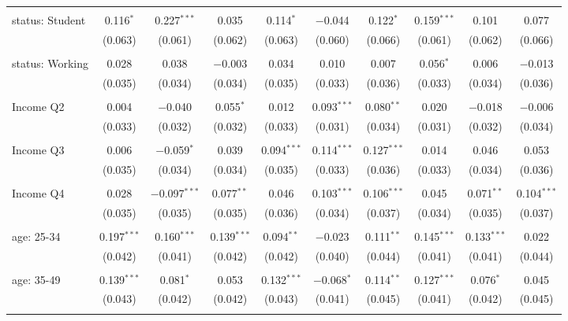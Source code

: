 \begin{tabular}{@{\extracolsep{5pt}}lccccccccc}
  & & & & & & & & & \\ 
 status: Student & 0.116$^{*}$ & 0.227$^{***}$ & 0.035 & 0.114$^{*}$ & $-$0.044 & 0.122$^{*}$ & 0.159$^{***}$ & 0.101 & 0.077 \\ 
  & (0.063) & (0.061) & (0.062) & (0.063) & (0.060) & (0.066) & (0.061) & (0.062) & (0.066) \\ 
  & & & & & & & & & \\ 
 status: Working & 0.028 & 0.038 & $-$0.003 & 0.034 & 0.010 & 0.007 & 0.056$^{*}$ & 0.006 & $-$0.013 \\ 
  & (0.035) & (0.034) & (0.034) & (0.035) & (0.033) & (0.036) & (0.033) & (0.034) & (0.036) \\ 
  & & & & & & & & & \\ 
 Income Q2 & 0.004 & $-$0.040 & 0.055$^{*}$ & 0.012 & 0.093$^{***}$ & 0.080$^{**}$ & 0.020 & $-$0.018 & $-$0.006 \\ 
  & (0.033) & (0.032) & (0.032) & (0.033) & (0.031) & (0.034) & (0.031) & (0.032) & (0.034) \\ 
  & & & & & & & & & \\ 
 Income Q3 & 0.006 & $-$0.059$^{*}$ & 0.039 & 0.094$^{***}$ & 0.114$^{***}$ & 0.127$^{***}$ & 0.014 & 0.046 & 0.053 \\ 
  & (0.035) & (0.034) & (0.034) & (0.035) & (0.033) & (0.036) & (0.033) & (0.034) & (0.036) \\ 
  & & & & & & & & & \\ 
 Income Q4 & 0.028 & $-$0.097$^{***}$ & 0.077$^{**}$ & 0.046 & 0.103$^{***}$ & 0.106$^{***}$ & 0.045 & 0.071$^{**}$ & 0.104$^{***}$ \\ 
  & (0.035) & (0.035) & (0.035) & (0.036) & (0.034) & (0.037) & (0.034) & (0.035) & (0.037) \\ 
  & & & & & & & & & \\ 
 age: 25-34 & 0.197$^{***}$ & 0.160$^{***}$ & 0.139$^{***}$ & 0.094$^{**}$ & $-$0.023 & 0.111$^{**}$ & 0.145$^{***}$ & 0.133$^{***}$ & 0.022 \\ 
  & (0.042) & (0.041) & (0.042) & (0.042) & (0.040) & (0.044) & (0.041) & (0.041) & (0.044) \\ 
  & & & & & & & & & \\ 
 age: 35-49 & 0.139$^{***}$ & 0.081$^{*}$ & 0.053 & 0.132$^{***}$ & $-$0.068$^{*}$ & 0.114$^{**}$ & 0.127$^{***}$ & 0.076$^{*}$ & 0.045 \\ 
  & (0.043) & (0.042) & (0.042) & (0.043) & (0.041) & (0.045) & (0.041) & (0.042) & (0.045) \\ 
  & & & & & & & & & \\ 

\end{tabular}
